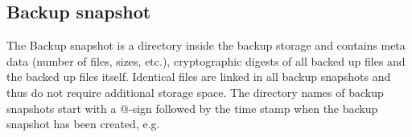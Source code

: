 \subsection{Backup snapshot}
         The Backup snapshot is a directory inside the
         backup storage and contains meta data (number of files, sizes, etc.),
         cryptographic digests of all backed up files and the backed up files itself.
         Identical files are linked in all backup snapshots and thus do not
         require additional storage space.
         The directory names of backup snapshots start with a @-sign followed by
         the time stamp when the backup snapshot has been created, e.g. 

